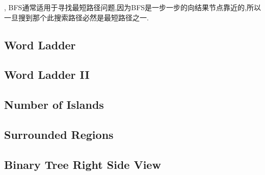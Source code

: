     
\qquad, BFS通常适用于寻找最短路径问题,因为BFS是一步一步的向结果节点靠近的,所以一旦搜到那个此搜索路径必然是最短路径之一.

\subsection{Word Ladder}

\subsection{Word Ladder II}

\subsection{Number of Islands}

\subsection{Surrounded Regions}

\subsection{Binary Tree Right Side View}

